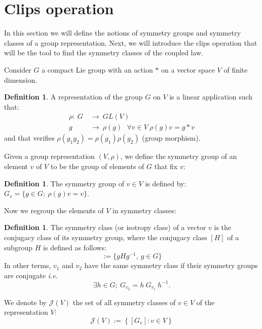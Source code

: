 \documentclass[11pt,a4paper]{amsart}
\theoremstyle{definition}
\newtheorem{defn}[thm]{Definition}
\newcommand{\J}{\mathcal{J}}                %
\newcommand{\1}{\mathds{1}}		            %
\newcommand{\set}[1]{\left\{#1\right\}}     %
\begin{document}
\section{Clips operation}
\par In this section we will define the notions of symmetry groups and symmetry classes of a group representation. Next, we will introduce the clips operation that will be the tool to find the symmetry classes of the coupled law.
\par Consider $G$ a compact Lie group with an action $*$ on a vector space $V$ of finite dimension.

\begin{defn}
A representation of the group $G$ on $V$ is a linear application such that:
\begin{align*}
  \rho:\ G\ &\rightarrow\ GL(V) \\ g\ &\rightarrow\ \rho(g) \ \ \ \forall v\in V\ \rho(g)v=g*v
\end{align*}
and that verifies $\rho(g_{1}g_{2})=\rho(g_{1})\rho(g_{2})$ (group morphism).
\end{defn}

Given a group representation $(V,\rho)$, we define the symmetry group of an element $v$ of $V$ to be the group of elements of $G$ that fix $v$:
\begin{defn}
The symmetry group of $v\in V$ is defined by:
  $G_v=\{g\in G;\ \rho(g)v=v\}$.
\end{defn}

Now we regroup the elements of $V$ in symmetry classes:

\begin{defn}
The symmetry class (or isotropy class) of a vector $v$ is the conjugacy class of its symmetry group, where the conjugacy class $[H]$ of a subgroup $H$ is defined as follows:
\begin{equation*}
[H] := \{g H g^{-1},\ g\in G\}
\end{equation*}
In other terms, $v_{1}$ and $v_{2}$ have the same symmetry class if their symmetry groups are conjugate \textit{i.e.}
\begin{equation*}
\exists h\in G;\ G_{v_{2}}=h\ G_{v_{1}}\ h^{-1}.
\end{equation*}
\end{defn}

\par We denote by $\J(V)$ the set of all symmetry classes of $v\in V$ of the representation $V$:
\begin{equation*}
\J(V):=\set{[G_v]:v\in V}
\end{equation*}
\end{document}
